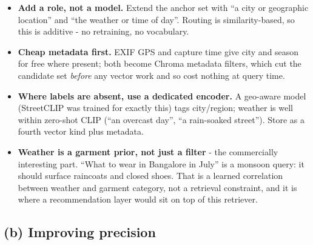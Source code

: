 \documentclass[10pt,a4paper]{article}
\begin{document}
\begin{itemize}
  \item \textbf{Add a role, not a model.} Extend the anchor set with ``a city or
        geographic location'' and ``the weather or time of day''. Routing is
        similarity-based, so this is additive - no retraining, no vocabulary.
  \item \textbf{Cheap metadata first.} EXIF GPS and capture time give city and season for
        free where present; both become Chroma metadata filters, which cut the candidate
        set \emph{before} any vector work and so cost nothing at query time.
  \item \textbf{Where labels are absent, use a dedicated encoder.} A geo-aware model
        (StreetCLIP was trained for exactly this) tags city/region; weather is well
        within zero-shot CLIP (``an overcast day'', ``a rain-soaked street''). Store as a
        fourth vector kind plus metadata.
  \item \textbf{Weather is a garment prior, not just a filter} - the commercially
        interesting part. ``What to wear in Bangalore in July'' is a monsoon query: it
        should surface raincoats and closed shoes. That is a learned correlation between
        weather and garment category, not a retrieval constraint, and it is where a
        recommendation layer would sit on top of this retriever.
\end{itemize}

\subsection{(b) Improving precision}
\end{document}
